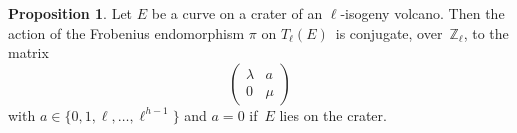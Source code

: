\documentclass[10pt,a4paper]{beamer}
\theoremstyle{plain}
\theoremstyle{definition}
\theoremstyle{definition}
\theoremstyle{definition}
\newtheorem{prop}[thm]{Proposition}
\theoremstyle{definition}
\theoremstyle{remark}
\theoremstyle{remark}
\begin{document}
\begin{frame}
\begin{columns}
\begin{column}[r]{6cm}
{\begin{figure}[h]
\begin{center}
	\end{center}
\end{figure}}
\end{column}
\end{columns}
\end{frame}

\begin{frame}

\begin{prop}\label{prop:matrice-Frobenius}
Let $E$ be a curve on a crater of an $\ell$-isogeny volcano.
Then the action of the Frobenius endomorphism $\pi$ on $T_\ell(E)$~is conjugate, over~$\mathbb{Z}_\ell$,
to the matrix \[\left ( \begin{matrix}\lambda & a\\ 0 & \mu \end{matrix}\right ) \]  with $a \in \{ 0,1,\ell, \dots, \ell^{h-1}  \}$ and $a = 0$ if~$E$ lies on the crater.

\end{prop}

\begin{figure}
\begin{center}


\end{center}
\end{figure}
\end{frame}
\end{document}
